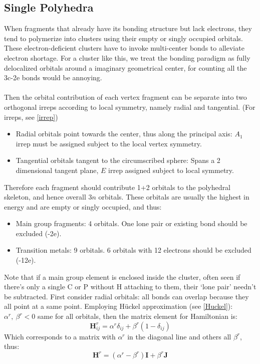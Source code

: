 \subsection{Single Polyhedra}
When fragments that already have its bonding structure but lack electrons, 
they tend to polymerize into clusters using their empty or singly occupied orbitals. 
These electron-deficient clusters have to invoke multi-center bonds to alleviate electron shortage.
For a cluster like this, we treat the bonding paradigm as fully delocalized orbitals around a imaginary geometrical center, 
for counting all the 3c-2e bonds would be annoying.\\ \\
%
Then the orbital contribution of each vertex fragment can be separate into two orthogonal irreps according to local symmetry, 
namely radial and tangential. (For irreps, see \ref{irrep})
\begin{itemize}
\item Radial orbitals point towards the center, thus along the principal axis: $A_1$ irrep must be assigned subject to the local vertex symmetry.
\item Tangential orbitals tangent to the circumscribed sphere: Spans a 2 dimensional tangent plane, $E$ irrep assigned subject to local symmetry.
\end{itemize}
%
Therefore each fragment should contribute 1+2 orbitals to the polyhedral skeleton, and hence overall $3n$ orbitals.
These orbitals are usually the highest in energy and are empty or singly occupied, and thus:
\begin{itemize}
\item Main group fragments: 4 orbitals. One lone pair or existing bond should be excluded (-2e).
\item Transition metals: 9 orbitals. 6 orbitals with 12 electrons should be excluded (-12e).
\end{itemize}
Note that if a main group element is enclosed inside the cluster, often seen if there's only a single C or P without H attaching to them, 
their `lone pair' needn't be subtracted.
First consider radial orbitals: all bonds can overlap because they all point at a same point. 
Employing H\"uckel approximation (see \ref{Huckel}): $\alpha^r,\ \beta^r<0$ same for all orbitals, then the matrix element for Hamiltonian is:
\[\mathbf{H}_{ij}^r = \alpha^r \delta_{ij} + \beta^r (1-\delta_{ij})\]
Which corresponds to a matrix with $\alpha^r$ in the diagonal line and others all $\beta^r$, thus:
\[\mathbf{H}^r = (\alpha^r - \beta^r)\mathbf{I} + \beta^r\mathbf{J}\]
